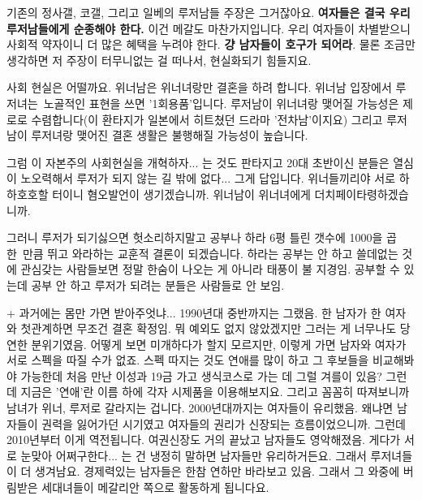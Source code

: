 기존의 정사갤, 코갤, 그리고 일베의 루저남들 주장은 그거잖아요.
\textbf{여자들은 결국 우리 루저남들에게 순종해야 한다.}
이건 메갈도 마찬가지입니다. 우리 여자들이 차별받으니 사회적 약자이니 더 많은 혜택을 누려야 한다. \textbf{걍 남자들이 호구가 되어라}.
물론 조금만 생각하면 저 주장이 터무니없는 걸 떠나서, 현실화되기 힘들지요.
\vspace{5mm}

사회 현실은 어떨까요.
위너남은 위너녀랑만 결혼을 하려 합니다. 위너남 입장에서 루저녀는 노골적인 표현을 쓰면 '1회용품'입니다.
루저남이 위너녀랑 맺어질 가능성은 제로로 수렴합니다(이 환타지가 일본에서 히트쳤던 드라마 '전차남'이지요)
그리고 루저남이 루저녀랑 맺어진 결혼 생활은 불행해질 가능성이 높습니다.
\vspace{5mm}

그럼 이 자본주의 사회현실을 개혁하자... 는 것도 판타지고
20대 초반이신 분들은 열심이 노오력해서 루저가 되지 않는 길 밖에 없다... 그게 답입니다.
위너들끼리야 서로 하하호호할 터이니 혐오발언이 생기겠습니까.
위너남이 위너녀에게 더치페이타령하겠습니까.
\vspace{5mm}

그러니 루저가 되기싫으면 헛소리하지말고 공부나 하라 6평 틀린 갯수에 1000을 곱한 만큼 뛰고 와라하는 교훈적 결론이 되겠습니다.
하라는 공부는 안 하고 쓸데없는 것에 관심갖는 사람들보면 정말 한숨이 나오는 게 아니라 태풍이 불 지경임.
공부할 수 있는데 공부 안 하고 루저가 되려는 분들은 사람들로 안 보임.
\vspace{5mm}

+
과거에는 몸만 가면 받아주엇냐... 1990년대 중반까지는 그랬음.
한 남자가 한 여자와 첫관계하면 무조건 결혼 확정임. 뭐 예외도 없지 않았겠지만 그러는 게 너무나도 당연한 분위기였음.
어떻게 보면 미개하다가 할지 모르지만, 이렇게 가면 남자와 여자가 서로 스펙을 따질 수가 없죠.
스펙 따지는 것도 연애를 많이 하고 그 후보들을 비교해봐야 가능한데 처음 만난 이성과 19금 가고 생식코스로 가는 데 그럴 겨를이 있음?
그런데 지금은 '연애'란 이름 하에 각자 시제품을 이용해보지요. 그리고 꼼꼼히 따져보니까 남녀가 위너, 루저로 갈라지는 겁니다.
2000년대까지는 여자들이 유리했음. 왜냐면 남자들이 권력을 잃어가던 시기였고 여자들의 권리가 신장되는 흐름이었으니까.
그런데 2010년부터 이게 역전됩니다. 여권신장도 거의 끝났고 남자들도 영악해졌음.
게다가 서로 눈맞아 어쩌구한다... 는 건 냉정히 말하면 남자들만 유리하거든요. 그래서 루저녀들이 더 생겨남요.
경제력있는 남자들은 한참 연하만 바라보고 있음. 그래서 그 와중에 버림받은 세대녀들이 메갈리안 쪽으로 활동하게 됩니다요.
\vspace{5mm}

